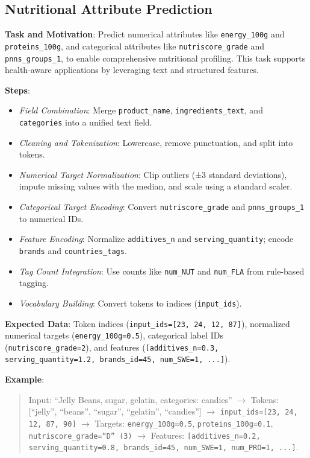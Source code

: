 \documentclass[11pt]{article}
\begin{document}
\subsection{Nutritional Attribute Prediction}

\textbf{Task and Motivation}: Predict numerical attributes like \texttt{energy\_100g} and \texttt{proteins\_100g}, and categorical attributes like \texttt{nutriscore\_grade} and \texttt{pnns\_groups\_1}, to enable comprehensive nutritional profiling. This task supports health-aware applications by leveraging text and structured features.

\textbf{Steps}:
\begin{itemize}[noitemsep]
    \item \textit{Field Combination}: Merge \texttt{product\_name}, \texttt{ingredients\_text}, and \texttt{categories} into a unified text field.
    \item \textit{Cleaning and Tokenization}: Lowercase, remove punctuation, and split into tokens.
    \item \textit{Numerical Target Normalization}: Clip outliers (±3 standard deviations), impute missing values with the median, and scale using a standard scaler.
    \item \textit{Categorical Target Encoding}: Convert \texttt{nutriscore\_grade} and \texttt{pnns\_groups\_1} to numerical IDs.
    \item \textit{Feature Encoding}: Normalize \texttt{additives\_n} and \texttt{serving\_quantity}; encode \texttt{brands} and \texttt{countries\_tags}.
    \item \textit{Tag Count Integration}: Use counts like \texttt{num\_NUT} and \texttt{num\_FLA} from rule-based tagging.
    \item \textit{Vocabulary Building}: Convert tokens to indices (\texttt{input\_ids}).
\end{itemize}

\textbf{Expected Data}: Token indices (\texttt{input\_ids=[23, 24, 12, 87]}), normalized numerical targets (\texttt{energy\_100g=0.5}), categorical label IDs (\texttt{nutriscore\_grade=2}), and features (\texttt{[additives\_n=0.3, serving\_quantity=1.2, brands\_id=45, num\_SWE=1, ...]}).

\textbf{Example}:
\begin{quote}
Input: ``Jelly Beans, sugar, gelatin, categories: candies'' $\to$ Tokens: [``jelly'', ``beans'', ``sugar'', ``gelatin'', ``candies''] $\to$ \texttt{input\_ids=[23, 24, 12, 87, 90]} $\to$ Targets: \texttt{energy\_100g=0.5}, \texttt{proteins\_100g=0.1}, \texttt{nutriscore\_grade=``D'' (3)} $\to$ Features: \texttt{[additives\_n=0.2, serving\_quantity=0.8, brands\_id=45, num\_SWE=1, num\_PRO=1, ...]}.
\end{quote}
\end{document}
